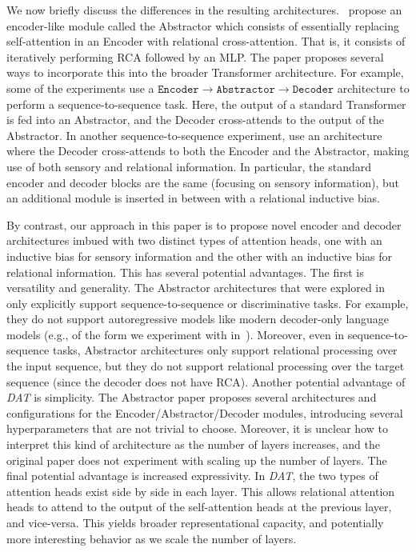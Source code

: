 We now briefly discuss the differences in the resulting architectures.~\citet{altabaa2024abstractors} propose an encoder-like module called the Abstractor which consists of essentially replacing self-attention in an Encoder with relational cross-attention. That is, it consists of iteratively performing RCA followed by an MLP. The paper proposes several ways to incorporate this into the broader Transformer architecture. For example, some of the experiments use a $\texttt{Encoder} \to \texttt{Abstractor} \to \texttt{Decoder}$ architecture to perform a sequence-to-sequence task. Here, the output of a standard Transformer is fed into an Abstractor, and the Decoder cross-attends to the output of the Abstractor. In another sequence-to-sequence experiment, \citet{altabaa2024abstractors} use an architecture where the Decoder cross-attends to both the Encoder and the Abstractor, making use of both sensory and relational information. In particular, the standard encoder and decoder blocks are the same (focusing on sensory information), but an additional module is inserted in between with a relational inductive bias.

By contrast, our approach in this paper is to propose novel encoder and decoder architectures imbued with two distinct types of attention heads, one with an inductive bias for sensory information and the other with an inductive bias for relational information. This has several potential advantages. The first is versatility and generality. The Abstractor architectures that were explored in~\citep{altabaa2024abstractors} only explicitly support sequence-to-sequence or discriminative tasks. For example, they do not support autoregressive models like modern decoder-only language models (e.g., of the form we experiment with in~). Moreover, even in sequence-to-sequence tasks, Abstractor architectures only support relational processing over the input sequence, but they do not support relational processing over the target sequence (since the decoder does not have RCA). Another potential advantage of \textit{DAT} is simplicity. The Abstractor paper proposes several architectures and configurations for the Encoder/Abstractor/Decoder modules, introducing several hyperparameters that are not trivial to choose. Moreover, it is unclear how to interpret this kind of architecture as the number of layers increases, and the original paper does not experiment with scaling up the number of layers. The final potential advantage is increased expressivity. In \textit{DAT}, the two types of attention heads exist side by side in each layer. This allows relational attention heads to attend to the output of the self-attention heads at the previous layer, and vice-versa. This yields broader representational capacity, and potentially more interesting behavior as we scale the number of layers.

